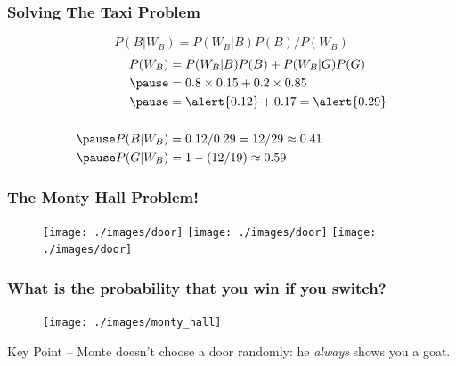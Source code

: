 \documentclass{beamer}
\begin{document}
\begin{frame}
\frametitle{Solving The Taxi Problem}
\footnotesize
{}
\normalsize

\pause
$$P(B|W_B) = P(W_B|B)P(B)/P(W_B)$$
\pause
\begin{align*}
	P(W_B) &= P(W_B|B) P(B) + P(W_B|G) P(G)\\ \pause
			&= 0.8\times 0.15 + 0.2 \times 0.85 \\ \pause
			&= \alert{0.12} + 0.17 = \alert{0.29}\\ \\ \pause
		P(B|W_B) &= 0.12/0.29 = 12/29 \approx 0.41\\ \pause
		P(G|W_B) &= 1 - (12/19) \approx 0.59 
	\end{align*}

\end{frame}

\begin{frame}
\frametitle{The Monty Hall Problem!}
\begin{figure}
\texttt{[image: ./images/door]}
\texttt{[image: ./images/door]}
\texttt{[image: ./images/door]}
\end{figure}
\begin{figure}
	\hspace{0.5em}
	\hspace{0.5em}
\end{figure}
\end{frame}


\begin{frame}
\frametitle{What is the probability that you win if you switch? }
\begin{figure}
\centering
	\texttt{[image: ./images/monty\_hall]}
\end{figure}
\end{frame}

\begin{frame}

\Huge Key Point -- Monte doesn't choose a door randomly: he \emph{always} shows you a goat.

\end{frame}
\end{document}
